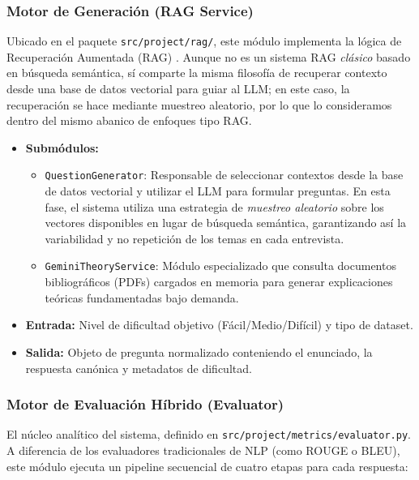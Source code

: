 \documentclass[12pt, a4paper]{article}
\begin{document}
\subsubsection{Motor de Generación (RAG Service)}
Ubicado en el paquete \texttt{src/project/rag/}, este módulo implementa la lógica de Recuperación Aumentada (RAG) \cite{rags}. Aunque no es un sistema RAG \textit{clásico} basado en búsqueda semántica, sí comparte la misma filosofía de recuperar contexto desde una base de datos vectorial para guiar al LLM; en este caso, la recuperación se hace mediante muestreo aleatorio, por lo que lo consideramos dentro del mismo abanico de enfoques tipo RAG.
\begin{itemize}
    \item \textbf{Submódulos:} 
        \begin{itemize}
            \item \texttt{QuestionGenerator}: Responsable de seleccionar contextos desde la base de datos vectorial y utilizar el LLM para formular preguntas. En esta fase, el sistema utiliza una estrategia de \textit{muestreo aleatorio} sobre los vectores disponibles en lugar de búsqueda semántica, garantizando así la variabilidad y no repetición de los temas en cada entrevista. 
            \item \texttt{GeminiTheoryService}: Módulo especializado que consulta documentos bibliográficos (PDFs) cargados en memoria para generar explicaciones teóricas fundamentadas bajo demanda.
        \end{itemize}
    \item \textbf{Entrada:} Nivel de dificultad objetivo (Fácil/Medio/Difícil) y tipo de dataset.
    \item \textbf{Salida:} Objeto de pregunta normalizado conteniendo el enunciado, la respuesta canónica y metadatos de dificultad.
\end{itemize}

\subsubsection{Motor de Evaluación Híbrido (Evaluator)}
El núcleo analítico del sistema, definido en \texttt{src/project/metrics/evaluator.py}. A diferencia de los evaluadores tradicionales de NLP (como ROUGE o BLEU), este módulo ejecuta un pipeline secuencial de cuatro etapas para cada respuesta:
\end{document}
